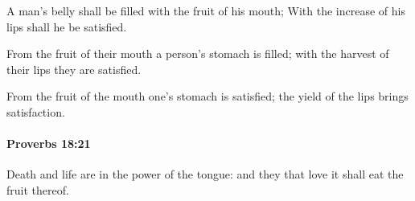 			\begin{versebox}
					\item[BHS] 
					\item[ASV] A man's belly shall be filled with the fruit of his mouth; With the increase of his lips shall he be satisfied.
					\item[NIV] From the fruit of their mouth a person’s stomach is filled; with the harvest of their lips they are satisfied.
					\item[NRSV] From the fruit of the mouth one’s stomach is satisfied; the yield of the lips brings satisfaction.
			\end{versebox}

		\paragraph{Proverbs 18:21} %
			\label{PROVERBS-18-21}

			Death and life are in the power of the tongue: and they that love it shall eat the fruit thereof.

